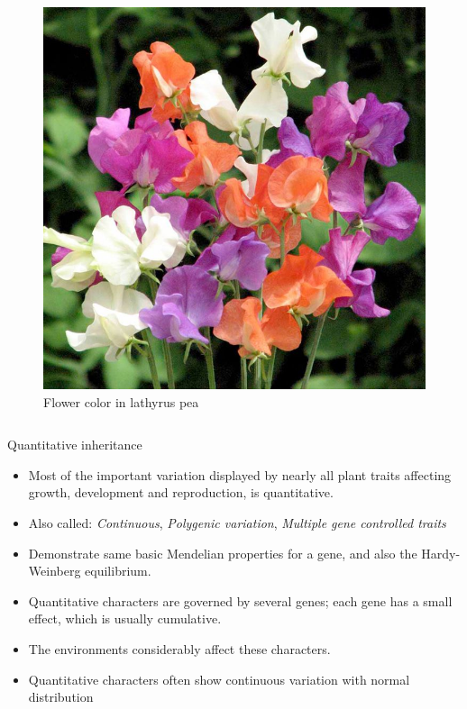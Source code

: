 \documentclass[11pt,ignorenonframetext,aspectratio=169]{beamer}
\providecommand{\tightlist}{%
  \setlength{\itemsep}{0pt}\setlength{\parskip}{0pt}}
\begin{document}
\begin{frame}{}
\begin{columns}[T]
\begin{figure}

{\centering \includegraphics[width=0.96\linewidth]{./images/Pea_lathyrus_odoratus_flower} 

}

\caption{Flower color in lathyrus pea}\label{fig:pea-flower}
\end{figure}

\end{columns}
\end{frame}

\begin{frame}{Quantitative inheritance}
\protect\hypertarget{quantitative-inheritance}{}
\begin{itemize}
\tightlist
\item
  Most of the important variation displayed by nearly all plant traits
  affecting growth, development and reproduction, is quantitative.
\item
  Also called: \emph{Continuous}, \emph{Polygenic variation},
  \emph{Multiple gene controlled traits}
\item
  Demonstrate same basic Mendelian properties for a gene, and also the
  Hardy-Weinberg equilibrium.
\item
  Quantitative characters are governed by several genes; each gene has a
  small effect, which is usually cumulative.
\item
  The environments considerably affect these characters.
\item
  Quantitative characters often show continuous variation with normal
  distribution
\end{itemize}
\end{frame}
\end{document}
